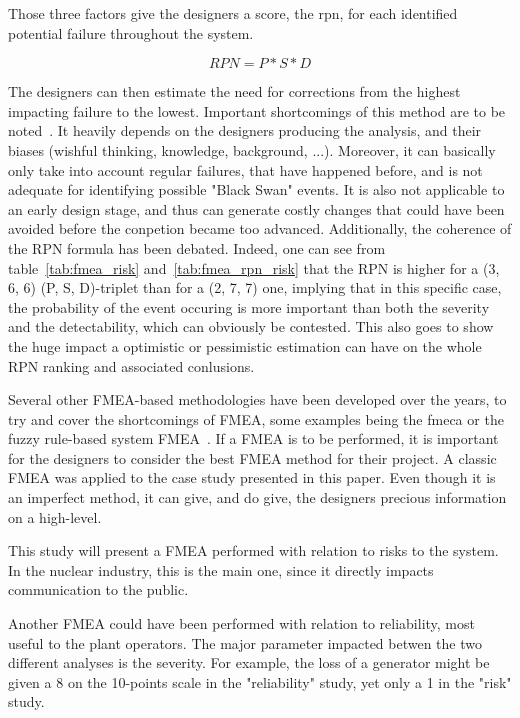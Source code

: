 Those three factors give the designers a score, the \gls{rpn}, for each identified potential failure throughout the system.

\begin{equation}
RPN = P * S * D
\end{equation}

The designers can then estimate the need for corrections from the highest impacting failure to the lowest. Important shortcomings of this method are to be noted~\cite{liu2013}. It heavily depends on the designers producing the analysis, and their biases (wishful thinking, knowledge, background, ...). Moreover, it can basically only take into account regular failures, that have happened before, and is not adequate for identifying possible "Black Swan" events. It is also not applicable to an early design stage, and thus can generate costly changes that could have been avoided before the conpetion became too advanced. Additionally, the coherence of the RPN formula has been debated. Indeed, one can see from table~\ref{tab:fmea_risk} and~\ref{tab:fmea_rpn_risk} that the RPN is higher for a (3, 6, 6) (P, S, D)-triplet than for a (2, 7, 7) one, implying that in this specific case, the probability of the event occuring is more important than both the severity and the detectability, which can obviously be contested. This also goes to show the huge impact a optimistic or pessimistic estimation can have on the whole RPN ranking and associated conlusions.

Several other FMEA-based methodologies have been developed over the years, to try and cover the shortcomings of FMEA, some examples being the \gls{fmeca} or the fuzzy rule-based system FMEA~\cite{bowles1995}. If a FMEA is to be performed, it is important for the designers to consider the best FMEA method for their project. A classic FMEA was applied to the case study presented in this paper. Even though it is an imperfect method, it can give, and do give, the designers precious information on a high-level.

This study will present a FMEA performed with relation to risks to the system. In the nuclear industry, this is the main one, since it directly impacts communication to the public.

Another FMEA could have been performed with relation to reliability, most useful to the plant operators. The major parameter impacted betwen the two different analyses is the severity. For example, the loss of a generator might be given a 8 on the 10-points scale in the "reliability" study, yet only a 1 in the "risk" study.

